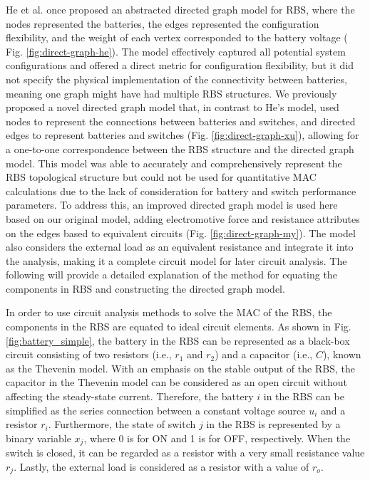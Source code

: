 \documentclass{article}
\begin{document}
He et al. \cite{heExploringAdaptiveReconfiguration2013} once proposed an abstracted directed graph model for RBS, where the nodes represented the batteries, the edges represented the configuration flexibility, and the weight of each vertex corresponded to the battery voltage ( Fig. \ref{fig:direct-graph-he}). 
The model effectively captured all potential system configurations and offered a direct metric for configuration flexibility, but it did not specify the physical implementation of the connectivity between batteries, meaning one graph might have had multiple RBS structures.
We previously proposed a novel directed graph model that, in contrast to He's model, used nodes to represent the connections between batteries and switches, and directed edges to represent batteries and switches (Fig. \ref{fig:direct-graph-xu}), allowing for a one-to-one correspondence between the RBS structure and the directed graph model. 
This model was able to accurately and comprehensively represent the RBS topological structure but could not be used for quantitative MAC calculations due to the lack of consideration for battery and switch performance parameters. 
To address this, an improved directed graph model is used here based on our original model, adding electromotive force and resistance attributes on the edges based to equivalent circuits (Fig. \ref{fig:direct-graph-my}).
The model also considers the external load as an equivalent resistance and integrate it into the analysis, making it a complete circuit model for later circuit analysis.
The following will provide a detailed explanation of the method for equating the components in RBS and constructing the directed graph model.


In order to use circuit analysis methods to solve the MAC of the RBS, the components in the RBS are equated to ideal circuit elements.
As shown in Fig. \ref{fig:battery_simple}, the battery in the RBS can be represented as a black-box circuit consisting of two resistors (i.e., $r_1$ and $r_2$) and a capacitor (i.e., $C$), known as the Thevenin model\cite{hongwenheStateofChargeEstimationLithiumIon2011,mousavig.VariousBatteryModels2014}.
With an emphasis on the stable output of the RBS, the capacitor in the Thevenin model can be considered as an open circuit without affecting the steady-state current.
Therefore, the battery $i$ in the RBS can be simplified as the series connection between a constant voltage source $u_{i}$ and a resistor $r_{i}$.
Furthermore, the state of switch $j$ in the RBS is represented by a binary variable $x_j$, where 0 is for ON and 1 is for OFF, respectively.
When the switch is closed, it can be regarded as a resistor with a very small resistance value $r_{j}$.
Lastly, the external load is considered as a resistor with a value of $r_o$.
\end{document}

